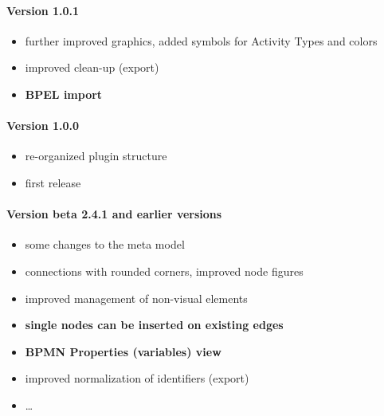 \paragraph{Version 1.0.1}
\begin{itemize}
	\item further improved graphics, added symbols for Activity Types and colors
	\item improved clean-up (export)
	\item \textbf{BPEL import}
\end{itemize}

\paragraph{Version 1.0.0}
\begin{itemize}
	\item re-organized plugin structure
	\item first release
\end{itemize}

\paragraph{Version beta 2.4.1 and earlier versions}
\begin{itemize}
	\item some changes to the meta model
	\item connections with rounded corners, improved node figures
	\item improved management of non-visual elements
	\item \textbf{single nodes can be inserted on existing edges}
	\item \textbf{BPMN Properties (variables) view}
	\item improved normalization of identifiers (export)
	\item \dots
\end{itemize}

